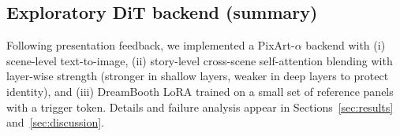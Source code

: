 \subsection{Exploratory DiT backend (summary)}
\label{sec:dit_method}

Following presentation feedback, we implemented a PixArt-$\alpha$ backend with (i) scene-level text-to-image, (ii) story-level cross-scene self-attention blending with layer-wise strength (stronger in shallow layers, weaker in deep layers to protect identity), and (iii) DreamBooth LoRA trained on a small set of reference panels with a trigger token.
Details and failure analysis appear in Sections~\ref{sec:results} and~\ref{sec:discussion}.
